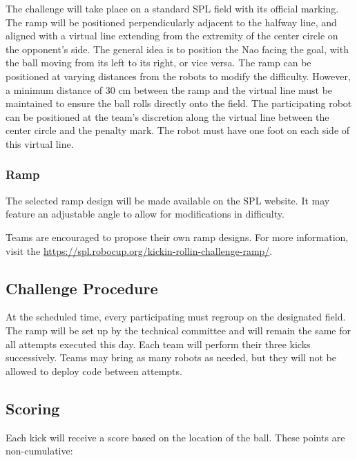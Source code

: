 The challenge will take place on a standard SPL field with its official marking. 
The ramp will be positioned perpendicularly adjacent to the halfway line, and aligned with a virtual line extending from the extremity of the center circle on the opponent's side.
The general idea is to position the Nao facing the goal, with the ball moving from its left to its right, or vice versa.
The ramp can be positioned at varying distances from the robots to modify the difficulty.
However, a minimum distance of 30 cm between the ramp and the virtual line must be maintained to ensure the ball rolls directly onto the field.
The participating robot can be positioned at the team’s discretion along the virtual line between the center circle and the penalty mark.
The robot must have one foot on each side of this virtual line.

\subsubsection{Ramp}

The selected ramp design will be made available on the SPL website. 
It may feature an adjustable angle to allow for modifications in difficulty.  

Teams are encouraged to propose their own ramp designs. 
For more information, visit the \url{https://spl.robocup.org/kickin-rollin-challenge-ramp/}.

\subsection{Challenge Procedure}

At the scheduled time, every participating must regroup on the designated field. 
The ramp will be set up by the technical committee and will remain the same for all attempts executed this day.
Each team will perform their three kicks successively.
Teams may bring as many robots as needed, but they will not be allowed to deploy code between attempts.

\subsection{Scoring}

Each kick will receive a score based on the location of the ball.
These points are non-cumulative: 


